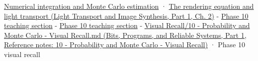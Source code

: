 \hypertarget{appendix-031e02bf28af-full-teaching-explanation}{}

\hyperref[03-visual-computing-i-ch012-numerical-integration-and-monte-carlo-estimation]{Numerical integration and Monte Carlo estimation} · \href{../04-Light-Transport-and-Image-Synthesis-P01/main.pdf\#03-visual-computing-i-ch007-the-rendering-equation-and-light-transport}{The rendering equation and light transport (Light Transport and Image Synthesis, Part 1, Ch. 2)} - \hyperref[02-foundations-ii-ch030-monte-carlo-estimates-trade-computation-for-uncertainty]{Phase 10 teaching section} - \hyperref[02-foundations-ii-ch029-transformations-turn-simple-inputs-into-useful-samples]{Phase 10 teaching section} - \href{../01-Bits-Programs-and-Reliable-Systems-P01/main.pdf\#appendix-cb5af353ef77}{Visual Recall/10 - Probability and Monte Carlo - Visual Recall.md (Bits, Programs, and Reliable Systems, Part 1, Reference notes: 10 - Probability and Monte Carlo - Visual Recall)} · Phase 10 visual recall
